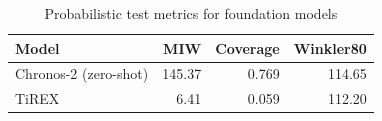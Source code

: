                 
      \begin{table}[h]%
        \centering
        \caption{Probabilistic test metrics for foundation models}
        \label{tab:results_exp0_foundation_prob}
        \begin{tabular}{lrrr}
        \toprule
        \textbf{Model} & \textbf{MIW} & \textbf{Coverage} & \textbf{Winkler80} \\
        \midrule
        Chronos-2 (zero-shot) & 145.37 & 0.769 & 114.65 \\
        TiREX                 &   6.41 & 0.059 & 112.20 \\
        \bottomrule
        \end{tabular}
        \end{table}


        
        
